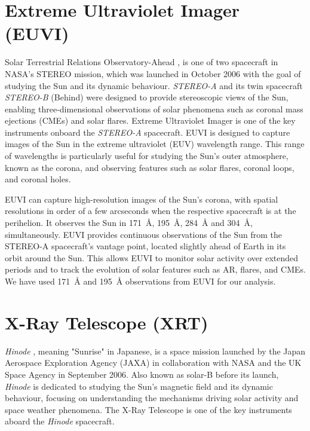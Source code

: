 \section{Extreme Ultraviolet Imager (EUVI)}

Solar Terrestrial Relations Observatory-Ahead \citep[{\it STEREO-A};][]{stereo}, is one of two spacecraft in NASA's STEREO mission, which was launched in October 2006 with the goal of studying the Sun and its dynamic behaviour. {\it STEREO-A} and its twin spacecraft {\it STEREO-B} (Behind) were designed to provide stereoscopic views of the Sun, enabling three-dimensional observations of solar phenomena such as coronal mass ejections (CMEs) and solar flares. Extreme Ultraviolet Imager \citep[EUVI;][]{euvi} is one of the key instruments onboard the {\it STEREO-A} spacecraft. EUVI is designed to capture images of the Sun in the extreme ultraviolet (EUV) wavelength range. This range of wavelengths is particularly useful for studying the Sun's outer atmosphere, known as the corona, and observing features such as solar flares, coronal loops, and coronal holes. 

EUVI can capture high-resolution images of the Sun's corona, with spatial resolutions in order of a few arcseconds when the respective spacecraft is at the perihelion. It observes the Sun in 171~{\AA}, 195~{\AA}, 284~{\AA} and 304~{\AA}, simultaneously. EUVI provides continuous observations of the Sun from the STEREO-A spacecraft's vantage point, located slightly ahead of Earth in its orbit around the Sun. This allows EUVI to monitor solar activity over extended periods and to track the evolution of solar features such as AR, flares, and CMEs. We have used 171~{\AA} and 195~{\AA} observations from EUVI for our analysis.

\section{X-Ray Telescope (XRT)}

{\it Hinode} \citep{hinode}, meaning "Sunrise" in Japanese, is a space mission launched by the Japan Aerospace Exploration Agency (JAXA) in collaboration with NASA and the UK Space Agency in September 2006. Also known as solar-B before its launch, {\it Hinode} is dedicated to studying the Sun's magnetic field and its dynamic behaviour, focusing on understanding the mechanisms driving solar activity and space weather phenomena. The X-Ray Telescope \citep[XRT;][]{xrt} is one of the key instruments aboard the {\it Hinode} spacecraft.

